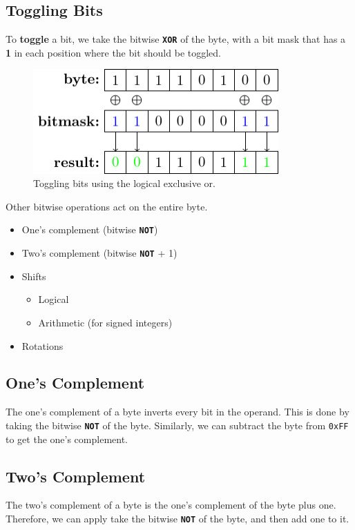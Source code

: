 \documentclass{report}
\newcommand{\keywordinline}[1]{\textcolor[rgb]{0.00,0.50,0.00}{\textbf{\texttt{#1}}}}
\begin{document}
\subsection{Toggling Bits}
To \textbf{toggle} a bit, we take the bitwise \keywordinline{XOR} of the byte, with a bit mask
that has a \textbf{1} in each position where the bit should be toggled.
\begin{figure}[H]
    \centering
    \includegraphics[height = 4cm, keepaspectratio = true]{figures/bit_toggle.pdf}
    \caption{Toggling bits using the logical exclusive or.} %
\end{figure}
Other bitwise operations act on the entire byte.
\begin{itemize}
    \item One's complement (bitwise \keywordinline{NOT})
    \item Two's complement (bitwise \keywordinline{NOT} + 1)
    \item Shifts
          \begin{itemize}
              \item Logical
              \item Arithmetic (for signed integers)
          \end{itemize}
    \item Rotations
\end{itemize}
\subsection{One's Complement}
The one's complement of a byte inverts every bit in the operand. This is done by
taking the bitwise \keywordinline{NOT} of the byte.
Similarly, we can subtract the byte from \texttt{0xFF} to get the one's complement.
\subsection{Two's Complement}
The two's complement of a byte is the one's complement of the byte plus one.
Therefore, we can apply take the bitwise \keywordinline{NOT} of the byte, and then add one to it.
\end{document}
